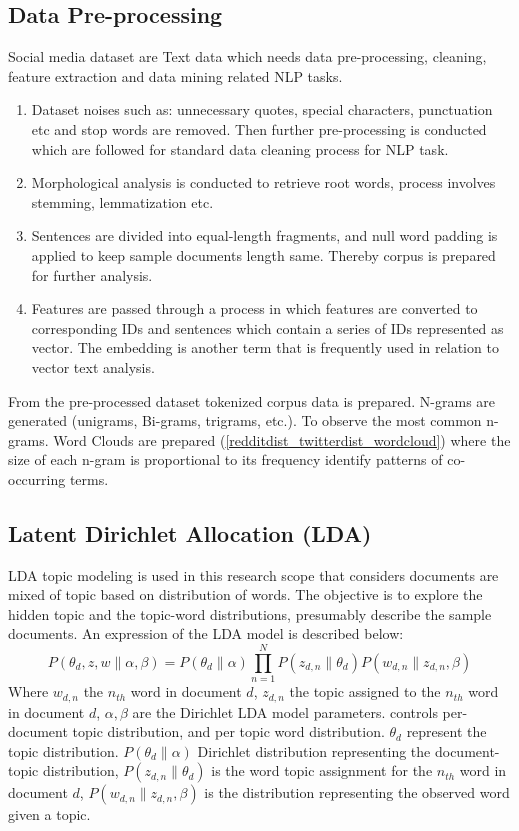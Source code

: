 \documentclass[sn-mathphys,Numbered]{sn-jnl}%
\theoremstyle{thmstyleone}%
\theoremstyle{thmstyletwo}%
\theoremstyle{thmstylethree}%
\begin{document}
\subsection{Data Pre-processing}\label{data_preprocessing}
Social media dataset are Text data which needs data pre-processing, cleaning, feature extraction and data mining related NLP tasks.
\begin{enumerate}[label=(\roman*)]
\item Dataset noises such as: unnecessary quotes, special characters, punctuation etc and stop words are removed. Then further pre-processing is conducted which are followed for standard data cleaning process for NLP task. 
\item Morphological analysis is conducted to retrieve root words, process involves stemming, lemmatization etc.
\item Sentences are divided into equal-length fragments, and null word padding is applied to keep sample documents length same. Thereby corpus is prepared for further analysis.
\item Features are passed through a process in which features are converted to corresponding IDs and sentences which contain a series of IDs represented as vector. The embedding is another term that is frequently used in relation to vector text analysis. 
\end{enumerate}

From the pre-processed dataset tokenized corpus data is prepared. N-grams are generated (unigrams, Bi-grams, trigrams, etc.). To observe the most common n-grams. Word Clouds are prepared (\ref{redditdist_twitterdist_wordcloud}) where the size of each n-gram is proportional to its frequency identify patterns of co-occurring terms. 

\subsection{Latent Dirichlet Allocation (LDA)}
\label{lda_mdel}
LDA topic modeling \cite{jelodar_latent_2019, gupta_pan_lda_2021, pichardo_lagunas_svd_lda_2015, selvi_classification_2019} is used in this research scope that considers documents are mixed of topic based on distribution of words. The objective is to explore the hidden topic and the topic-word distributions, presumably describe the sample documents. An expression of the LDA model is described below:  
\begin{equation}
P(\theta_d,z,w\|\alpha,\beta)=P(\theta_d\|\alpha)\prod^N_{n=1}P(z_{d,n}\|\theta_d)P(w_{d,n}\|z_{d,n},\beta)
\end{equation}
Where $w_{d,n}$ the $n_{th}$ word in document $d$, $z_{d,n}$ the topic assigned to the $n_{th}$ word in document $d$, $\alpha,\beta$ are the Dirichlet LDA model parameters. controls per-document topic distribution, and per topic word distribution. $\theta_d$ represent the topic distribution. $P(\theta_d \| \alpha)$ Dirichlet 
distribution representing the document-topic distribution, $P(z_{d,n}\|\theta_d)$ is the word topic assignment for the $n_{th}$ word in document $d$, $P(w_{d,n}\|z_{d,n},\beta)$ is the distribution representing the observed word given a topic. 
\end{document}
